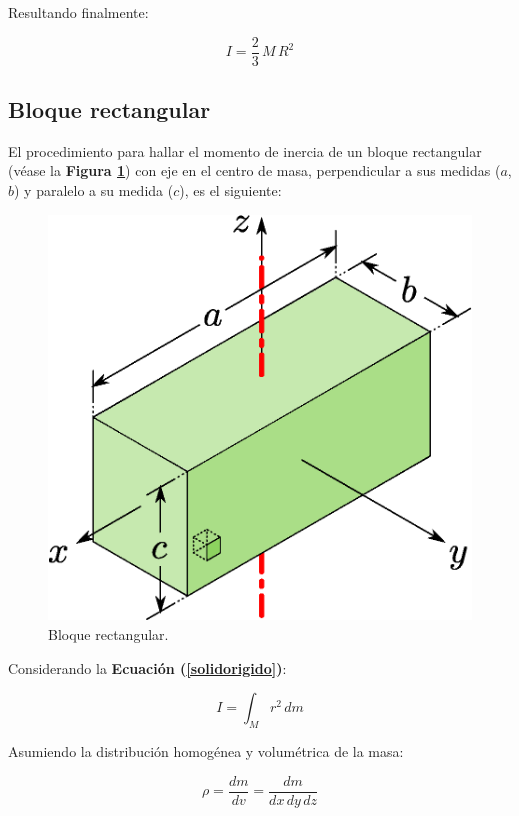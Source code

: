 \documentclass[letter,oneside,11pt]{article}
\begin{document}
Resultando finalmente:

\begin{equation}
    I = \frac{2}{3}\, M\, R^2
\end{equation}

\subsection{Bloque rectangular}
El procedimiento para hallar el momento de inercia de un bloque rectangular
(véase la \textbf{Figura \ref{figura16}}) con eje en el centro de masa,
perpendicular a sus medidas ($a$, $b$) y paralelo a su medida ($c$),
es el siguiente:

\begin{figure}
\centering
\includegraphics[scale=0.5]{resources/f16.eps}
\caption{Bloque rectangular.}
\label{figura16}
\end{figure}

Considerando la \textbf{Ecuación (\ref{solidorigido})}:

\begin{equation*}
    I = \int_{M} r^2\, dm
\tag{4}
\end{equation*}

Asumiendo la distribución homogénea y volumétrica de la masa:

\begin{equation*}
    \rho = \frac{dm}{dv} = \frac{dm}{dx\, dy\, dz}
\end{equation*}
\end{document}
